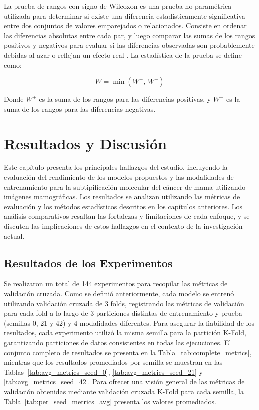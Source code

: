\documentclass[a4paper,10pt]{book}
\begin{document}
La prueba de rangos con signo de Wilcoxon es una prueba no paramétrica utilizada para determinar si existe una diferencia estadísticamente significativa entre dos conjuntos de valores emparejados o relacionados. Consiste en ordenar las diferencias absolutas entre cada par, y luego comparar las sumas de los rangos positivos y negativos para evaluar si las diferencias observadas son probablemente debidas al azar o reflejan un efecto real \cite{demsar_statistical_2006}. La estadística de la prueba se define como:

\begin{equation}
W = \min \left( W^+,\, W^- \right)
\end{equation}

Donde $W^+$ es la suma de los rangos para las diferencias positivas, y $W^-$ es la suma de los rangos para las diferencias negativas.

\chapter{Resultados y Discusión}

Este capítulo presenta los principales hallazgos del estudio, incluyendo la evaluación del rendimiento de los modelos propuestos y las modalidades de entrenamiento para la subtipificación molecular del cáncer de mama utilizando imágenes mamográficas. Los resultados se analizan utilizando las métricas de evaluación y los métodos estadísticos descritos en los capítulos anteriores. Los análisis comparativos resaltan las fortalezas y limitaciones de cada enfoque, y se discuten las implicaciones de estos hallazgos en el contexto de la investigación actual.

\section{Resultados de los Experimentos}

Se realizaron un total de 144 experimentos para recopilar las métricas de validación cruzada. Como se definió anteriormente, cada modelo se entrenó utilizando validación cruzada de 3 folds, registrando las métricas de validación para cada fold a lo largo de 3 particiones distintas de entrenamiento y prueba (semillas 0, 21 y 42) y 4 modalidades diferentes. Para asegurar la fiabilidad de los resultados, cada experimento utilizó la misma semilla para la partición K-Fold, garantizando particiones de datos consistentes en todas las ejecuciones. El conjunto completo de resultados se presenta en la Tabla~\ref{tab:complete_metrics}, mientras que los resultados promediados por semilla se muestran en las Tablas~\ref{tab:avg_metrics_seed_0}, \ref{tab:avg_metrics_seed_21} y \ref{tab:avg_metrics_seed_42}. Para ofrecer una visión general de las métricas de validación obtenidas mediante validación cruzada K-Fold para cada semilla, la Tabla~\ref{tab:per_seed_metrics_avg} presenta los valores promediados.
\end{document}
